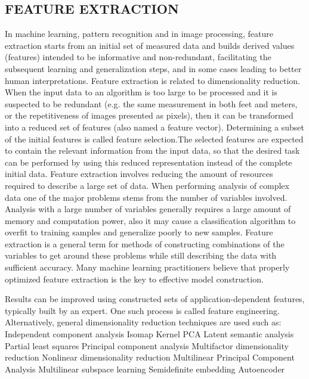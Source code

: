 \subsection{FEATURE EXTRACTION}
In machine learning, pattern recognition and in image processing, feature extraction starts from an initial set of measured data and builds derived values (features) intended to be informative and non-redundant, facilitating the subsequent learning and generalization steps, and in some cases leading to better human interpretations. Feature extraction is related to dimensionality reduction.
When the input data to an algorithm is too large to be processed and it is suspected to be redundant (e.g. the same measurement in both feet and meters, or the repetitiveness of images presented as pixels), then it can be transformed into a reduced set of features (also named a feature vector). Determining a subset of the initial features is called feature selection.The selected features are expected to contain the relevant information from the input data, so that the desired task can be performed by using this reduced representation instead of the complete initial data.
Feature extraction involves reducing the amount of resources required to describe a large set of data. When performing analysis of complex data one of the major problems stems from the number of variables involved. Analysis with a large number of variables generally requires a large amount of memory and computation power, also it may cause a classification algorithm to overfit to training samples and generalize poorly to new samples. Feature extraction is a general term for methods of constructing combinations of the variables to get around these problems while still describing the data with sufficient accuracy. Many machine learning practitioners believe that properly optimized feature extraction is the key to effective model construction.

Results can be improved using constructed sets of application-dependent features, typically built by an expert. One such process is called feature engineering. Alternatively, general dimensionality reduction techniques are used such as:
Independent component analysis
Isomap
Kernel PCA
Latent semantic analysis
Partial least squares
Principal component analysis
Multifactor dimensionality reduction
Nonlinear dimensionality reduction
Multilinear Principal Component Analysis
Multilinear subspace learning
Semidefinite embedding
Autoencoder





